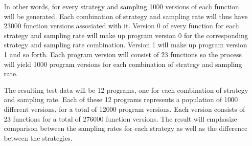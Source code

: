 In other words, for every strategy and sampling 1000 versions of each function will be
generated. Each combination of strategy and sampling rate will thus have 23000 function
versions assosiated with it. Version 0 of every function for each strategy and sampling
rate will make up program version 0 for the corresponding strategy and sampling rate
combination. Version 1 will make up program version 1 and so forth. Each program version
will consist of 23 functions so the process will yield 1000 program versions for each
combination of strategy and sampling rate.

The resulting test data will be 12 programs, one for each combination of strategy and
sampling rate. Each of these 12 programs represents a population of 1000 different versions,
for a total of 12000 program versions. Each version consists of 23 functions for a total
of 276000 function versions. The result will emphasize comparison between the sampling
rates for each strategy as well as the difference between the strategies.
